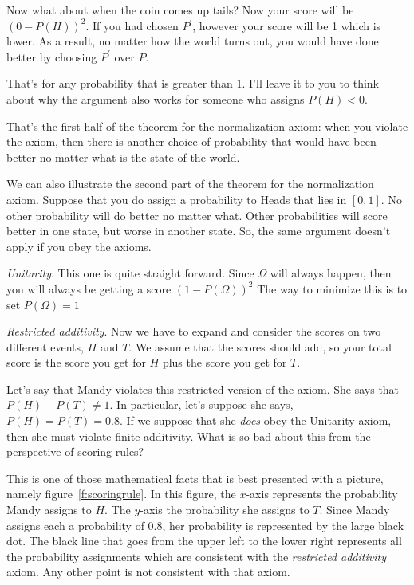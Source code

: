 Now what about when the coin comes up tails?  Now your score will be $(0-P(H))^2$. If you had chosen $P^\prime$, however your score will be 1 which is lower. As a result, no matter how the world turns out, you would have done better by choosing $P^\prime$ over $P$.

That's for any probability that is greater than $1$.  I'll leave it to you to think about why the argument also works for someone who assigns $P(H) < 0$.

That's the first half of the theorem for the normalization axiom: when you violate the axiom, then there is another choice of probability that would have been better no matter what is the state of the world.

We can also illustrate the second part of the theorem for the normalization axiom.  Suppose that you do assign a probability to Heads that lies in $[0,1]$.  No other probability will do better no matter what.  Other probabilities will score better in one state, but worse in another state.  So, the same argument doesn't apply if you obey the axioms.

{\it Unitarity}.  This one is quite straight forward.  Since $\Omega$ will always happen, then you will always be getting a score $(1 - P(\Omega))^2$  The way to minimize this is to set $P(\Omega) = 1$

{\it Restricted additivity}. Now we have to expand and consider the scores on two different events, $H$ and $T$.  We assume that the scores should add, so your total score is the score you get for $H$ plus the score you get for $T$.

Let's say that Mandy violates this restricted version of the axiom.  She says that $P(H) + P(T) \ne 1$.  In particular, let's suppose she says, $P(H) = P(T) = 0.8$.  If we suppose that she {\it does} obey the Unitarity axiom, then she must violate finite additivity. What is so bad about this from the perspective of scoring rules?

This is one of those mathematical facts that is best presented with a picture, namely figure~\ref{f:scoringrule}. In this figure, the $x$-axis represents the probability Mandy assigns to $H$.  The $y$-axis the probability she assigns to $T$. Since Mandy assigns each a probability of 0.8, her probability is represented by the large black dot.  The black line that goes from the upper left to the lower right represents all the probability assignments which are consistent with the {\it restricted additivity} axiom.  Any other point is not consistent with that axiom.

